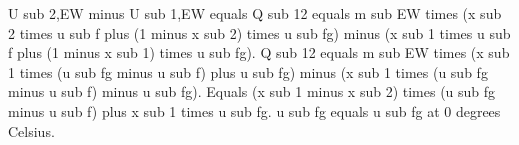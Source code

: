 U sub 2,EW minus U sub 1,EW equals Q sub 12 equals m sub EW times (x sub 2 times u sub f plus (1 minus x sub 2) times u sub fg) minus (x sub 1 times u sub f plus (1 minus x sub 1) times u sub fg).  
Q sub 12 equals m sub EW times (x sub 1 times (u sub fg minus u sub f) plus u sub fg) minus (x sub 1 times (u sub fg minus u sub f) minus u sub fg).  
Equals (x sub 1 minus x sub 2) times (u sub fg minus u sub f) plus x sub 1 times u sub fg.  
u sub fg equals u sub fg at 0 degrees Celsius.